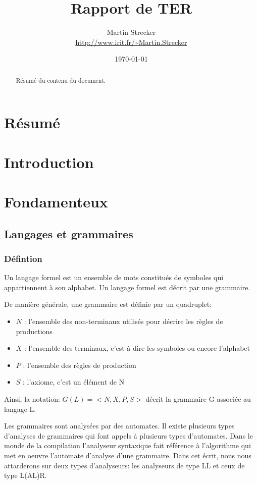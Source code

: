 \documentclass{article}
\title{Rapport de TER}
\author{Martin Strecker\\
\url{http://www.irit.fr/~Martin.Strecker}}
\date{\today}
\begin{document}
\maketitle
\tableofcontents

\begin{abstract}
Résumé du contenu du document.
\end{abstract}




\section{Résumé}
\label{hints}

\section{Introduction}
\label{hints}

\section{Fondamenteux}
\label{hints}
\subsection{Langages et grammaires}
\subsubsection{Défintion}
		Un langage formel est un ensemble de mots constitués de symboles qui appartiennent à son alphabet.
Un langage formel est décrit par une grammaire. 

De manière générale, une grammaire est définie par un quadruplet:
\begin{itemize}
\item $N$ : l’ensemble des non-terminaux utilisés pour décrire les règles de productions
\item $X$ : l’ensemble des terminaux, c’est à dire les symboles ou encore l’alphabet
\item $P$ : l’ensemble des règles de production
\item $S$ : l’axiome, c’est un élément de N
\end{itemize}

Ainsi, la notation: $G(L) = <N, X, P, S>$ décrit la grammaire G associée au langage L.

Les grammaires sont analysées par des automates. Il existe plusieurs types d’analyses de grammaires qui font appels à plusieurs types d’automates.
Dans le monde de la compilation l’analyseur syntaxique fait référence à l’algorithme qui met en oeuvre l’automate d’analyse d’une grammaire.
Dans cet écrit, nous nous attarderons sur deux types d’analyseurs: les analyseurs de type LL et ceux de type L(AL)R.
\end{document}
